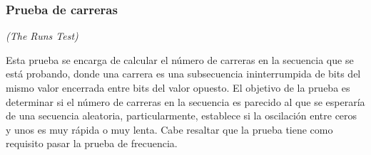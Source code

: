 

\subsubsection{Prueba de carreras} %
\textit{(The Runs Test)}


Esta prueba se encarga de calcular el número de carreras en la secuencia que
se está probando, donde una carrera es una subsecuencia ininterrumpida de
bits del mismo valor encerrada entre bits del valor opuesto. El objetivo de
la prueba es determinar si el número de carreras en la secuencia es parecido
al que se esperaría de una secuencia aleatoria, particularmente, establece si
la oscilación entre ceros y unos es muy rápida o muy lenta. Cabe resaltar que
la prueba tiene como requisito pasar la prueba de frecuencia.


